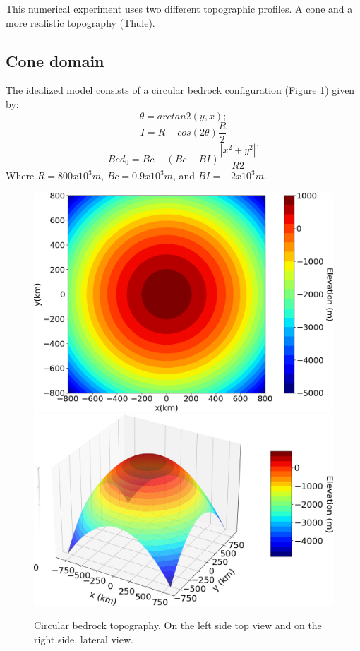\documentclass{article}
\begin{document}
This numerical experiment uses two different topographic profiles. A cone and a more realistic topography (Thule).
\subsection{Cone domain}
The idealized model consists of a circular bedrock configuration (Figure \ref{circular_topo_top}) given by:
\begin{equation}
	\theta=arctan2(y,x);
\end{equation}
\begin{equation}
	I=R-cos(2\theta)\frac{R}{2}
\end{equation}
\begin{equation}
	Bed_0=Bc-(Bc-BI)\frac{|x^2+y^2|}{R2}^;
\end{equation}
Where $R=800x10^3 m$, $Bc=0.9 x 10^3 m$, and $BI=-2 x 10^3 m$. 
\begin{figure}[!h]
	\centering
	\includegraphics[width=0.45\linewidth]{../fig/circular_topo_top.png}
	\includegraphics[width=0.45\linewidth]{../fig/circular_topo_jet}
	\caption{Circular bedrock topography. On the left side top view and on the right side, lateral view.}
	\label{circular_topo_top}
\end{figure}
\end{document}
